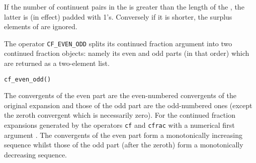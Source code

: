 If the number of continuent pairs in the 
is greater than the length of the , the latter is
(in effect) padded with 1's. Conversely if it is shorter, the surplus
elements of  are ignored.

\hypertarget{CF_EVEN_ODD:operator}{}
The operator \texttt{CF\_EVEN\_ODD} splits its continued fraction argument
 into two continued fraction objects: namely its even and
odd parts (in that order) which are returned as a two-element list.
\begin{syntaxtable}
  \texttt{cf\_even\_odd(}\texttt{)}
\end{syntaxtable}
The convergents of the even part are the even-numbered convergents of the
original expansion and those of the odd part are the odd-numbered ones
(except the zeroth convergent which is necessarily zero).  For the continued
fraction expansions generated by the operators \texttt{cf} and
\texttt{cfrac} with a numerical first argument . The convergents of
the even part form a monotonically increasing sequence whilst those of the
odd part (after the zeroth) form a monotonically decreasing sequence.

